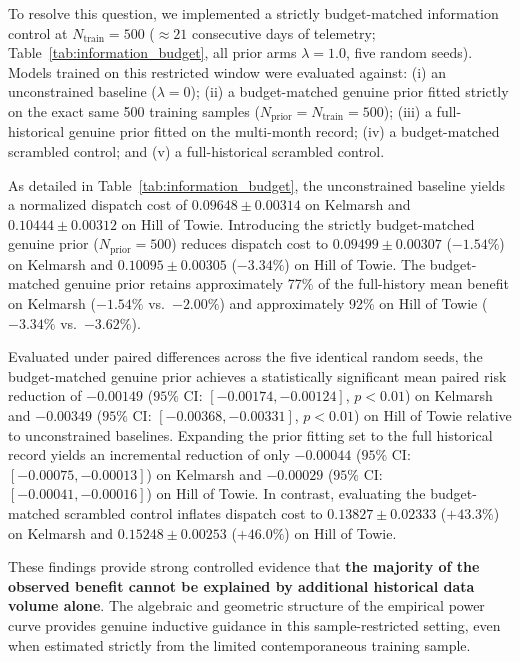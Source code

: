 To resolve this question, we implemented a strictly budget-matched information control at $N_{\text{train}}=500$ ($\approx 21$ consecutive days of telemetry; Table~\ref{tab:information_budget}, all prior arms $\lambda=1.0$, five random seeds). Models trained on this restricted window were evaluated against: (i) an unconstrained baseline ($\lambda=0$); (ii) a budget-matched genuine prior fitted strictly on the exact same 500 training samples ($N_{\text{prior}}=N_{\text{train}}=500$); (iii) a full-historical genuine prior fitted on the multi-month record; (iv) a budget-matched scrambled control; and (v) a full-historical scrambled control.



As detailed in Table~\ref{tab:information_budget}, the unconstrained baseline yields a normalized dispatch cost of $0.09648 \pm 0.00314$ on Kelmarsh and $0.10444 \pm 0.00312$ on Hill of Towie. Introducing the strictly budget-matched genuine prior ($N_{\text{prior}}=500$) reduces dispatch cost to $0.09499 \pm 0.00307$ ($-1.54\%$) on Kelmarsh and $0.10095 \pm 0.00305$ ($-3.34\%$) on Hill of Towie. The budget-matched genuine prior retains approximately 77\% of the full-history mean benefit on Kelmarsh ($-1.54\%$ vs.\ $-2.00\%$) and approximately 92\% on Hill of Towie ($-3.34\%$ vs.\ $-3.62\%$).

Evaluated under paired differences across the five identical random seeds, the budget-matched genuine prior achieves a statistically significant mean paired risk reduction of $-0.00149$ ($95\%$ CI: $[-0.00174, -0.00124]$, $p < 0.01$) on Kelmarsh and $-0.00349$ ($95\%$ CI: $[-0.00368, -0.00331]$, $p < 0.01$) on Hill of Towie relative to unconstrained baselines. Expanding the prior fitting set to the full historical record yields an incremental reduction of only $-0.00044$ ($95\%$ CI: $[-0.00075, -0.00013]$) on Kelmarsh and $-0.00029$ ($95\%$ CI: $[-0.00041, -0.00016]$) on Hill of Towie. In contrast, evaluating the budget-matched scrambled control inflates dispatch cost to $0.13827 \pm 0.02333$ ($+43.3\%$) on Kelmarsh and $0.15248 \pm 0.00253$ ($+46.0\%$) on Hill of Towie.

These findings provide strong controlled evidence that \textbf{the majority of the observed benefit cannot be explained by additional historical data volume alone}. The algebraic and geometric structure of the empirical power curve provides genuine inductive guidance in this sample-restricted setting, even when estimated strictly from the limited contemporaneous training sample.
